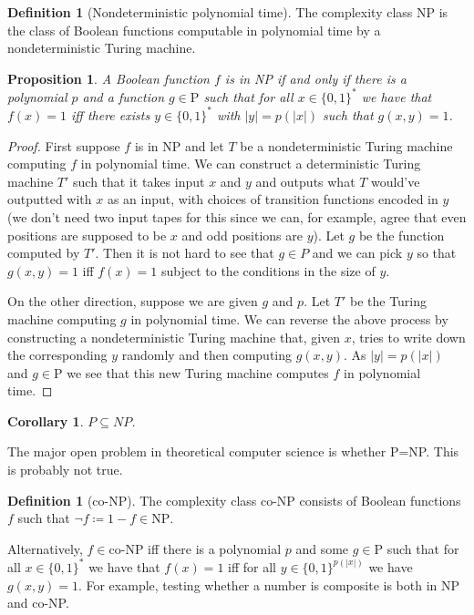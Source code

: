 \documentclass{report}
\theoremstyle{definition}
\theoremstyle{plain}
\newtheorem{prop}[thm]{Proposition}
\newtheorem{coro}[thm]{Corollary}
\theoremstyle{definition}
\newtheorem{defn}[thm]{Definition}
\begin{document}
	\begin{defn}[Nondeterministic polynomial time]
		The complexity class NP is the class of Boolean functions computable in polynomial time by a nondeterministic Turing machine.
	\end{defn}
	\begin{prop}\label{prop:NP_snd_defn}
		A Boolean function $f$ is in NP if and only if there is a polynomial $p$ and a function $g\in \text{P}$ such that for all $x\in\{0,1\}^*$ we have that $f(x) = 1$ iff there exists $y\in\{0,1\}^*$ with $|y|=p(|x|)$ such that $g(x,y) = 1$.
	\end{prop}
	\begin{proof}
		First suppose $f$ is in NP and let $T$ be a nondeterministic Turing machine computing $f$ in polynomial time. We can construct a deterministic Turing machine $T'$ such that it takes input $x$ and $y$ and outputs what $T$ would've outputted with $x$ as an input, with choices of transition functions encoded in $y$ (we don't need two input tapes for this since we can, for example, agree that even positions are supposed to be $x$ and odd positions are $y$). Let $g$ be the function computed by $T'$. Then it is not hard to see that $g\in P$ and we can pick $y$ so that $g(x,y) = 1$ iff $f(x) = 1$ subject to the conditions in the size of $y$.
		
		On the other direction, suppose we are given $g$ and $p$. Let $T'$ be the Turing machine computing $g$ in polynomial time. We can reverse the above process by constructing a nondeterministic Turing machine that, given $x$, tries to write down the corresponding $y$ randomly and then computing $g(x,y)$. As $|y| = p(|x|)$ and $g\in \text{P}$ we see that this new Turing machine computes $f$ in polynomial time.
	\end{proof}
	\begin{coro}
		$P\subseteq NP$.
	\end{coro}
	The major open problem in theoretical computer science is whether P=NP. This is probably not true.
	\begin{defn}[co-NP]
		The complexity class co-NP consists of Boolean functions $f$ such that $\neg f \coloneqq 1 - f \in \text{NP}$.
	\end{defn}
	Alternatively, $f\in\text{co-NP}$ iff there is a polynomial $p$ and some $g\in\text{P}$ such that for all $x\in\{0,1\}^*$ we have that $f(x) = 1$ iff for all $y\in\{0,1\}^{p(|x|)}$ we have $g(x,y) = 1$. For example, testing whether a number is composite is both in NP and co-NP.
	
\end{document}
